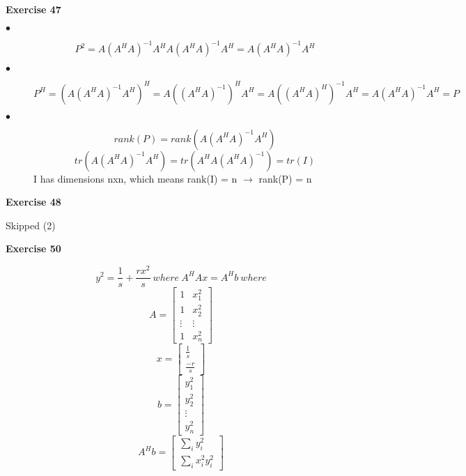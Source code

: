 \documentclass[letterpaper,12pt]{article}
\theoremstyle{definition}
\begin{document}
\noindent\textbf{Exercise 47} 
\begin{description}
\item [$\bullet$] \[P^2 = A(A^HA)^{-1}A^HA(A^HA)^{-1}A^H = A(A^HA)^{-1}A^H\]
\item [$\bullet$] \[P^H = (A(A^HA)^{-1}A^H)^H = A((A^HA)^{-1})^HA^H = A((A^HA)^H)^{-1}A^H = A(A^HA)^{-1}A^H = P\]
\item [$\bullet$] \[rank(P) = rank(A(A^HA)^{-1}A^H)\]
\[tr(A(A^HA)^{-1}A^H) = tr(A^HA(A^HA)^{-1}) = tr(I)\]
I has dimensions nxn, which means rank(I) = n $\rightarrow$ rank(P) = n
\end{description}

\noindent\textbf{Exercise 48} 
\begin{description}
\item Skipped (2)
\end{description}

\noindent\textbf{Exercise 50} 
\begin{description}
\item \[y^2 = \frac{1}{s} + \frac{rx^2}{s} \ where \ A^HAx = A^Hb \ where\]
  \[A =
  \begin{bmatrix}
   1 & x_1^2 \\
   1 & x_2^2 \\
   \vdots & \vdots \\
   1 & x_n^2
\end{bmatrix}
\]
  \[x =
  \begin{bmatrix}
   \frac{1}{s} \\
   \frac{-r}{s}
\end{bmatrix}
\]
  \[b =
  \begin{bmatrix}
    y_1^2 \\
   y_2^2 \\
   \vdots \\
   y_n^2
\end{bmatrix}
\]
  \[A^Hb =
  \begin{bmatrix}
   \sum_i y_i^2 \\
   \sum_i x_i^2y_i^2
\end{bmatrix}
\]
\end{description}
\end{document}
